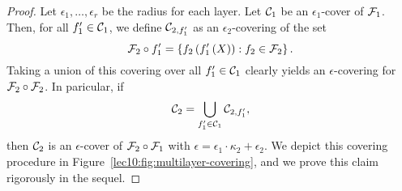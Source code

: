 \begin{proof}
	Let $\epsilon_1,\dots,\epsilon_r$ be the radius for each layer. Let $\mathcal C_1$ be an $\epsilon_1$-cover of $\mathcal F_1$. Then, for all $f_1' \in \mathcal C_1$, we define $\mathcal C_{2, f_1'}$ as an $\epsilon_2$-covering of  the set 
	\begin{equation}
	\mathcal F_2 \circ f_1' = \left\{f_2\left(f_1'\left(X\right)\right) : f_2 \in \mathcal F_2 \right\}.
	\end{equation}
	Taking a union of this covering over all $f_1' \in \mathcal C_1$ clearly yields an $\epsilon$-covering for $\mathcal F_2 \circ \mathcal F_2$. In paricular, if 
	\begin{align}
	\mathcal C_2 = \bigcup_{f_1'\in \mathcal C_1}\mathcal C_{2,f_1'},
	\end{align} 
	then $\mathcal C_2$ is an $\epsilon$-cover of $\mathcal F_2 \circ \mathcal F_1$ with $\epsilon = \epsilon_1 \cdot \kappa_2 + \epsilon_2$. We depict this covering procedure in Figure~\ref{lec10:fig:multilayer-covering}, and we prove this claim rigorously in the sequel.
	

\end{proof}
